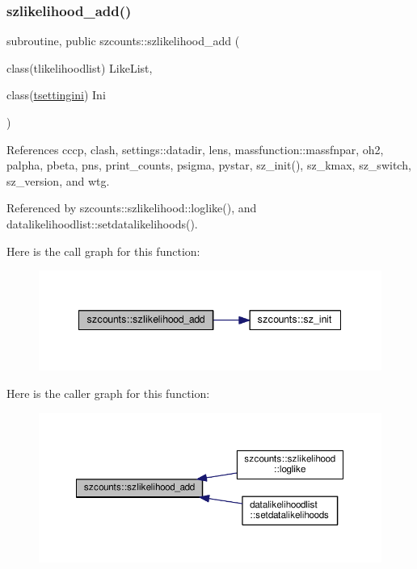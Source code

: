 \subsubsection{\texorpdfstring{szlikelihood\+\_\+add()}{szlikelihood\_add()}}
{\footnotesize\ttfamily subroutine, public szcounts\+::szlikelihood\+\_\+add (\begin{DoxyParamCaption}\item[{class(tlikelihoodlist)}]{Like\+List,  }\item[{class(\mbox{\hyperlink{structsettings_1_1tsettingini}{tsettingini}})}]{Ini }\end{DoxyParamCaption})}



References cccp, clash, settings\+::datadir, lens, massfunction\+::massfnpar, oh2, palpha, pbeta, pns, print\+\_\+counts, psigma, pystar, sz\+\_\+init(), sz\+\_\+kmax, sz\+\_\+switch, sz\+\_\+version, and wtg.



Referenced by szcounts\+::szlikelihood\+::loglike(), and datalikelihoodlist\+::setdatalikelihoods().

Here is the call graph for this function\+:
\nopagebreak
\begin{figure}[H]
\begin{center}
\leavevmode
\includegraphics[width=342pt]{namespaceszcounts_a0c8563799b2d0ed9c6c98a8164fa46b9_cgraph}
\end{center}
\end{figure}
Here is the caller graph for this function\+:
\nopagebreak
\begin{figure}[H]
\begin{center}
\leavevmode
\includegraphics[width=350pt]{namespaceszcounts_a0c8563799b2d0ed9c6c98a8164fa46b9_icgraph}
\end{center}
\end{figure}


